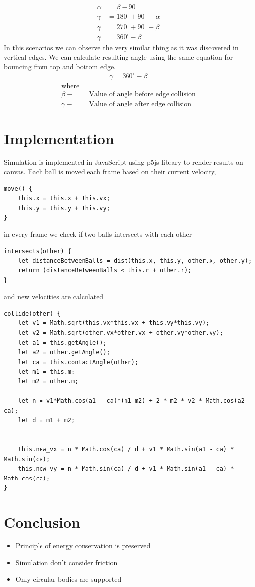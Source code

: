 \documentclass[]{report}
\begin{document}
\begin{equation}
\begin{aligned}
\label{eq:bottom_edge}
\alpha &= \beta - 90^{\circ} \\
\gamma &= 180^{\circ} + 90^{\circ} - \alpha \\
\gamma &= 270^{\circ} + 90^{\circ} - \beta \\
\gamma &= 360^{\circ} - \beta 
\end{aligned}
\end{equation}
In this scenarios we can observe the very similar thing as it was discovered in vertical edges. We can calculate resulting angle using the same equation for bouncing from top and bottom edge.
\begin{equation}
\begin{aligned}
\label{eq:horizontal_edge}
\gamma = 360^{\circ} - \beta
\end{aligned}
\end{equation}
\begin{align*}
\text{where} \\
\beta -& \text{~~Value of angle before edge collision} \\
\gamma -& \text{~~Value of angle after edge collision}
\end{align*}
\section{Implementation}
Simulation is implemented in JavaScript using p5js library to render results on canvas. Each ball is moved each frame based on their current velocity,
\begin{lstlisting}
move() {
	this.x = this.x + this.vx;
	this.y = this.y + this.vy;
}
\end{lstlisting}
in every frame we check if two balls intersects with each other
\begin{lstlisting}
intersects(other) {
	let distanceBetweenBalls = dist(this.x, this.y, other.x, other.y);
	return (distanceBetweenBalls < this.r + other.r);
}
\end{lstlisting}
and new velocities are calculated
\begin{lstlisting}
collide(other) {
	let v1 = Math.sqrt(this.vx*this.vx + this.vy*this.vy);
	let v2 = Math.sqrt(other.vx*other.vx + other.vy*other.vy);
	let a1 = this.getAngle();
	let a2 = other.getAngle();
	let ca = this.contactAngle(other);
	let m1 = this.m;
	let m2 = other.m;
	
	let n = v1*Math.cos(a1 - ca)*(m1-m2) + 2 * m2 * v2 * Math.cos(a2 - ca);
	let d = m1 + m2;
	
	
	this.new_vx = n * Math.cos(ca) / d + v1 * Math.sin(a1 - ca) * Math.sin(ca);
	this.new_vy = n * Math.sin(ca) / d + v1 * Math.sin(a1 - ca) * Math.cos(ca);
}
\end{lstlisting}
\section{Conclusion}
\begin{itemize}
	\item Principle of energy conservation is preserved
	\item Simulation don't consider friction
	\item Only circular bodies are supported
\end{itemize}
\end{document}
